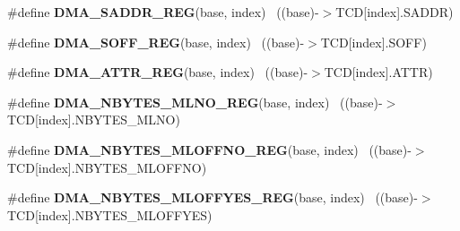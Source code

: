\begin{DoxyCompactItemize}
\item 
\hypertarget{group___d_m_a___register___accessor___macros_ga5593a86722c2a220119832d3525c935e}{}\#define {\bfseries D\+M\+A\+\_\+\+S\+A\+D\+D\+R\+\_\+\+R\+E\+G}(base,  index)                            ~((base)-\/$>$T\+C\+D\mbox{[}index\mbox{]}.S\+A\+D\+D\+R)\label{group___d_m_a___register___accessor___macros_ga5593a86722c2a220119832d3525c935e}

\item 
\hypertarget{group___d_m_a___register___accessor___macros_ga4281cd5537db8d2c2be02f05733e445f}{}\#define {\bfseries D\+M\+A\+\_\+\+S\+O\+F\+F\+\_\+\+R\+E\+G}(base,  index)                              ~((base)-\/$>$T\+C\+D\mbox{[}index\mbox{]}.S\+O\+F\+F)\label{group___d_m_a___register___accessor___macros_ga4281cd5537db8d2c2be02f05733e445f}

\item 
\hypertarget{group___d_m_a___register___accessor___macros_ga0e66ebdf291a7b58fc0f63d3099b59ea}{}\#define {\bfseries D\+M\+A\+\_\+\+A\+T\+T\+R\+\_\+\+R\+E\+G}(base,  index)                              ~((base)-\/$>$T\+C\+D\mbox{[}index\mbox{]}.A\+T\+T\+R)\label{group___d_m_a___register___accessor___macros_ga0e66ebdf291a7b58fc0f63d3099b59ea}

\item 
\hypertarget{group___d_m_a___register___accessor___macros_ga2936d3609db9424be9adbfe9c9794f3b}{}\#define {\bfseries D\+M\+A\+\_\+\+N\+B\+Y\+T\+E\+S\+\_\+\+M\+L\+N\+O\+\_\+\+R\+E\+G}(base,  index)                ~((base)-\/$>$T\+C\+D\mbox{[}index\mbox{]}.N\+B\+Y\+T\+E\+S\+\_\+\+M\+L\+N\+O)\label{group___d_m_a___register___accessor___macros_ga2936d3609db9424be9adbfe9c9794f3b}

\item 
\hypertarget{group___d_m_a___register___accessor___macros_ga640456412b303a0ac970a12ed515cb6f}{}\#define {\bfseries D\+M\+A\+\_\+\+N\+B\+Y\+T\+E\+S\+\_\+\+M\+L\+O\+F\+F\+N\+O\+\_\+\+R\+E\+G}(base,  index)          ~((base)-\/$>$T\+C\+D\mbox{[}index\mbox{]}.N\+B\+Y\+T\+E\+S\+\_\+\+M\+L\+O\+F\+F\+N\+O)\label{group___d_m_a___register___accessor___macros_ga640456412b303a0ac970a12ed515cb6f}

\item 
\hypertarget{group___d_m_a___register___accessor___macros_ga45c0196d88bde8e59830ffa37a4351fa}{}\#define {\bfseries D\+M\+A\+\_\+\+N\+B\+Y\+T\+E\+S\+\_\+\+M\+L\+O\+F\+F\+Y\+E\+S\+\_\+\+R\+E\+G}(base,  index)        ~((base)-\/$>$T\+C\+D\mbox{[}index\mbox{]}.N\+B\+Y\+T\+E\+S\+\_\+\+M\+L\+O\+F\+F\+Y\+E\+S)\label{group___d_m_a___register___accessor___macros_ga45c0196d88bde8e59830ffa37a4351fa}


\end{DoxyCompactItemize}
